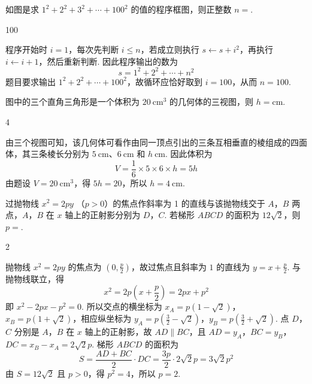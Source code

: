 \begin{problem}
如图是求 \(1^{2} + 2^{2} + 3^{2} + \cdots + 100^{2}\) 的值的程序框图，则正整数 \(n =\)\fillinblank{}.

\end{problem}

\begin{answer}
100
\end{answer}

\begin{solution}
程序开始时 \(i=1\)，每次先判断 \(i\leqslant n\)，若成立则执行
\(s\leftarrow s+i^2\)，再执行 \(i\leftarrow i+1\)，然后重新判断. 因此程序输出的数为
\[
s=1^2+2^2+\cdots+n^2
\]
题目要求输出 \(1^2+2^2+\cdots+100^2\)，故循环应恰好取到 \(i=100\)，从而 \(n=100\).
\end{solution}

\begin{problem}
图中的三个直角三角形是一个体积为 \(20 \mathrm{~cm}^{3}\) 的几何体的三视图，则 \(h = \)\fillinblank{}\(\mathrm{cm}\).

\end{problem}

\begin{answer}
4
\end{answer}

\begin{solution}
由三个视图可知，该几何体可看作由同一顶点引出的三条互相垂直的棱组成的四面体，其三条棱长分别为 \(5\mathrm{~cm}\)、\(6\mathrm{~cm}\) 和 \(h \mathrm{~cm}\). 因此体积为
\[
V=\frac16\times5\times6\times h=5h
\]
由题设 \(V=20 \mathrm{~cm}^{3}\)，得 \(5h=20\)，所以 \(h=4 \mathrm{~cm}\).
\end{solution}

\begin{problem}
过抛物线 \(x^{2} = 2py\) （\(p > 0\)）的焦点作斜率为 1 的直线与该抛物线交于 \(A\)，\(B\) 两点，\(A\)，\(B\) 在 \(x\) 轴上的正射影分别为 \(D\)，\(C\). 若梯形 \(ABCD\) 的面积为 \(12\sqrt{2}\)，则 \(p = \)\fillinblank{}.
\end{problem}

\begin{answer}
2
\end{answer}

\begin{solution}
抛物线 \(x^2=2py\) 的焦点为 \(\left(0,\frac p2\right)\)，故过焦点且斜率为 \(1\) 的直线为
\(y=x+\frac p2\). 与抛物线联立，得
\[
x^2=2p\left(x+\frac p2\right)=2px+p^2
\]
即 \(x^2-2px-p^2=0\). 所以交点的横坐标为
\(x_A=p(1-\sqrt2)\)，\(x_B=p(1+\sqrt2)\)，相应纵坐标为
\(y_A=p\left(\frac32-\sqrt2\right)\)，\(y_B=p\left(\frac32+\sqrt2\right)\).
点 \(D\)，\(C\) 分别是 \(A\)，\(B\) 在 \(x\) 轴上的正射影，故 \(AD\parallel BC\)，且
\(AD=y_A\)，\(BC=y_B\)，\(DC=x_B-x_A=2\sqrt2p\).
梯形 \(ABCD\) 的面积为
\[
S=\frac{AD+BC}{2}\cdot DC
=\frac{3p}{2}\cdot2\sqrt2p=3\sqrt2p^2
\]
由 \(S=12\sqrt2\) 且 \(p>0\)，得 \(p^2=4\)，所以 \(p=2\).
\end{solution}

